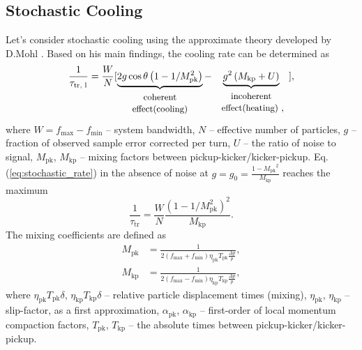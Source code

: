 \documentclass[a4paper,
               keeplastbox,   %
               ]{jacow}
\begin{document}
\subsection{Stochastic Cooling}
	\par Let's consider stochastic cooling using the approximate theory developed by D.Mohl \cite{b5, b6}. Based on his main findings, the cooling rate can be determined as
\begin{equation}
	\frac{1}{\tau_{\textrm{tr, l}}}=\frac{W}{N}[\underbrace{2 g \cos \theta\left(1-1 / M_{\textrm{pk}}^2\right)}_{\begin{array}{c}
			\text { \small{coherent} } \\
			\text { \small{effect(cooling)} }
	\end{array}}-\underbrace{g^2\left(M_{\textrm{kp}}+U\right)}_{\begin{array}{c}
			\text { \small{incoherent} } \\
			\text { \small{effect(heating)} },
	\end{array}}],
	\label{eq:stochastic_rate}
\end{equation}	
	\noindent where $W=f_{\text{max}}-f_{\text{min}}$ -- system bandwidth, $N$ -- effective number of particles, $g$ -- fraction of observed sample error corrected per turn, $U$ -- the ratio of noise to signal, $M_{\text{pk}}$, $M_{\text{kp}}$ -- mixing factors between pickup-kicker/kicker-pickup. Eq. (\ref{eq:stochastic_rate}) in the absence of noise at $g=g_0={\frac{1-{M_{\text{pk}}}^2}{M_{\text{kp}}}}$ reaches the maximum
\begin{equation}
		\frac{1}{\tau_{\textrm{tr}}}=\frac{W}{N} \frac{\left(1-1 / M_{\textrm{pk}}^2\right)^2}{M_{\textrm{kp}}}.
	\label{eq:cooling_rate}
\end{equation}
	\noindent The mixing coefficients are defined as
\begin{equation}
	\begin{aligned}
		M_{\textrm{pk}} & =\frac{1}{2\left(f_{\max }+f_{\min }\right) \eta_{\textrm{pk}} T_{\textrm{pk}} \frac{\Delta p}{p}}, \\
		M_{\textrm{kp}} & =\frac{1}{2\left(f_{\max }-f_{\min }\right) \eta_{\textrm{kp}} T_{\textrm{kp}} \frac{\Delta p}{p}},
	\end{aligned}
	\label{eq:mixing_coeff}
\end{equation}
	\noindent where $\eta_{\text{pk}}T_{\text{pk}}\delta$, $\eta_{\text{kp}}T_{\text{kp}}\delta$ -- relative particle displacement times (mixing),  $\eta_{\text{pk}}$, $\eta_{\text{kp}}$ -- slip-factor, as a first approximation, $\alpha_{\text{pk}}$, $\alpha_{\text{kp}}$ -- first-order of local momentum compaction factors, $T_{\text{pk}}$, $T_{\text{kp}}$ -- the absolute times between pickup-kicker/kicker-pickup.
\end{document}
